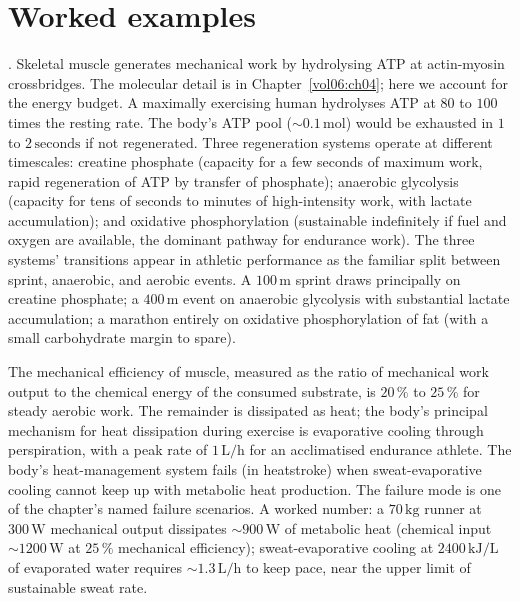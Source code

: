 \section{Worked examples}

. Skeletal muscle
generates mechanical work by hydrolysing ATP at actin-myosin
crossbridges. The molecular detail is in Chapter~\ref{vol06:ch04};
here we account for the energy budget. A maximally exercising human
hydrolyses ATP at $80$ to $100$ times the resting rate. The body's
ATP pool ($\sim 0.1\,\text{mol}$) would be exhausted in $1$ to
$2\,\text{seconds}$ if not regenerated. Three regeneration systems
operate at different timescales: creatine phosphate (capacity for a
few seconds of maximum work, rapid regeneration of ATP by transfer
of phosphate); anaerobic glycolysis (capacity for tens of seconds to
minutes of high-intensity work, with lactate accumulation); and
oxidative phosphorylation (sustainable indefinitely if fuel and
oxygen are available, the dominant pathway for endurance work). The
three systems' transitions appear in athletic performance as the
familiar split between sprint, anaerobic, and aerobic events. A
$100\,\text{m}$ sprint draws principally on creatine phosphate; a
$400\,\text{m}$ event on anaerobic glycolysis with substantial
lactate accumulation; a marathon entirely on oxidative phosphorylation
of fat (with a small carbohydrate margin to spare).

The mechanical efficiency of muscle, measured as the ratio of
mechanical work output to the chemical energy of the consumed
substrate, is $20\,\%$ to $25\,\%$ for steady aerobic work. The
remainder is dissipated as heat; the body's principal mechanism for
heat dissipation during exercise is evaporative cooling through
perspiration, with a peak rate of $1\,\text{L}/\text{h}$ for an
acclimatised endurance athlete. The body's heat-management system
fails (in heatstroke) when sweat-evaporative cooling cannot keep up
with metabolic heat production. The failure mode is one of the
chapter's named failure scenarios. A worked number: a $70\,\text{kg}$
runner at $300\,\text{W}$ mechanical output dissipates
$\sim 900\,\text{W}$ of metabolic heat (chemical input $\sim 1200\,
\text{W}$ at $25\,\%$ mechanical efficiency); sweat-evaporative cooling
at $2400\,\text{kJ}/\text{L}$ of evaporated water requires
$\sim 1.3\,\text{L}/\text{h}$ to keep pace, near the upper limit of
sustainable sweat rate.

